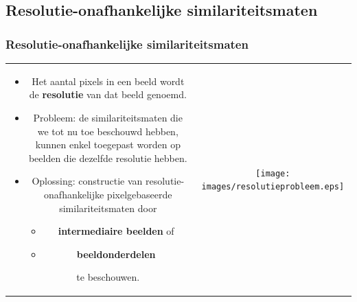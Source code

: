 \documentclass[dutch]{beamer}
\theoremstyle{definition}
\theoremstyle{remark}
\theoremstyle{example}
\begin{document}
\subsection{Resolutie-onafhankelijke similariteitsmaten}
\frame
{
  \frametitle{Resolutie-onafhankelijke similariteitsmaten}
  
  \centering
  \begin{tabular}{@{}cc@{}}
  \begin{minipage}{0.7\textwidth}
  \begin{itemize}
  \item Het aantal pixels in een beeld wordt de \textbf{resolutie} van dat beeld genoemd.
  \item Probleem: de similariteitsmaten die we tot nu toe beschouwd hebben, kunnen 
  enkel toegepast worden op beelden die dezelfde resolutie hebben.
  \item Oplossing: constructie van resolutie-onafhankelijke 
  pixelgebaseerde similariteitsmaten door
  \begin{itemize}
      \item \textbf{intermediaire beelden} of 
      \item \textbf{beeldonderdelen} 
  \end{itemize}
  te beschouwen.
  \end{itemize}
  \end{minipage} &
  \begin{minipage}{0.25\textwidth}
  \texttt{[image: images/resolutieprobleem.eps]}
  \end{minipage}
  \end{tabular}
}
\frame
\end{document}
